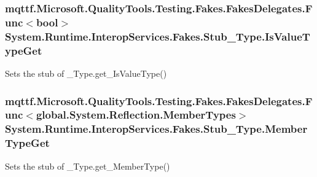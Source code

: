 \hypertarget{class_system_1_1_runtime_1_1_interop_services_1_1_fakes_1_1_stub___type_afca3604cbbf18a8207a7c3d3886d9a4f}{
\subsubsection[{Is\-Value\-Type\-Get}]{\setlength{\rightskip}{0pt plus 5cm}mqttf.\-Microsoft.\-Quality\-Tools.\-Testing.\-Fakes.\-Fakes\-Delegates.\-Func$<$bool$>$ System.\-Runtime.\-Interop\-Services.\-Fakes.\-Stub\-\_\-\-Type.\-Is\-Value\-Type\-Get}}\label{class_system_1_1_runtime_1_1_interop_services_1_1_fakes_1_1_stub___type_afca3604cbbf18a8207a7c3d3886d9a4f}


Sets the stub of \-\_\-\-Type.\-get\-\_\-\-Is\-Value\-Type()

\hypertarget{class_system_1_1_runtime_1_1_interop_services_1_1_fakes_1_1_stub___type_a1c39cd8d4c08c70daedc31363c46f5e7}{
\subsubsection[{Member\-Type\-Get}]{\setlength{\rightskip}{0pt plus 5cm}mqttf.\-Microsoft.\-Quality\-Tools.\-Testing.\-Fakes.\-Fakes\-Delegates.\-Func$<$global.\-System.\-Reflection.\-Member\-Types$>$ System.\-Runtime.\-Interop\-Services.\-Fakes.\-Stub\-\_\-\-Type.\-Member\-Type\-Get}}\label{class_system_1_1_runtime_1_1_interop_services_1_1_fakes_1_1_stub___type_a1c39cd8d4c08c70daedc31363c46f5e7}


Sets the stub of \-\_\-\-Type.\-get\-\_\-\-Member\-Type()

